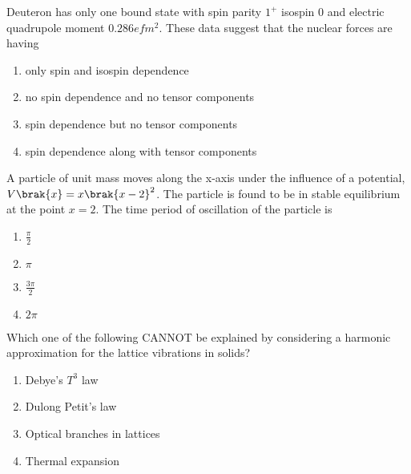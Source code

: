     \item Deuteron has only one bound state with spin parity $1^+$ isospin $0$ and electric quadrupole moment 
    $0.286 efm^2$. These data suggest that the nuclear forces are having 
    \begin{enumerate}
        \item only spin and isospin dependence
        \item no spin dependence and no tensor components
        \item spin dependence but no tensor components
        \item spin dependence along with tensor components
    \end{enumerate}

    \item A particle of unit mass moves along the x-axis under the influence of a potential, $V\brak{x} = x\brak{x-2}^2$. The particle is found to be in stable equilibrium at the point $x=2$. The time period of oscillation of the particle is
    \begin{multicols}{4}
        \begin{enumerate}
            \item $\frac{\pi}{2}$
            \item $\pi$
            \item $\frac{3 \pi}{2}$
            \item $2\pi$
        \end{enumerate}
    \end{multicols}

    \item Which one of the following CANNOT be explained by considering a harmonic approximation for the lattice vibrations in solids?
    \begin{multicols}{2}
        \begin{enumerate}
            \item Debye's $T^3$ law
            \item Dulong Petit's law
            \item Optical branches in lattices
            \item Thermal expansion
        \end{enumerate}
    \end{multicols}

